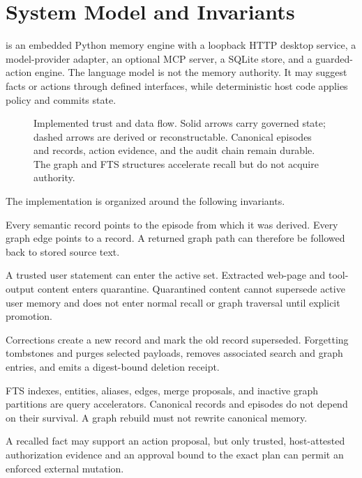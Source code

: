 \section{System Model and Invariants}
\label{sec:system-model}

\system{} is an embedded Python memory engine with a loopback HTTP desktop service, a model-provider adapter, an optional MCP server, a SQLite store, and a guarded-action engine. The language model is not the memory authority. It may suggest facts or actions through defined interfaces, while deterministic host code applies policy and commits state.

\begin{figure}[t]
  \centering
  
  \caption{Implemented trust and data flow. Solid arrows carry governed state; dashed arrows are derived or reconstructable. Canonical episodes and records, action evidence, and the audit chain remain durable. The graph and FTS structures accelerate recall but do not acquire authority.}
  \label{fig:architecture}
\end{figure}

The implementation is organized around the following invariants.

 Every semantic record points to the episode from which it was derived. Every graph edge points to a record. A returned graph path can therefore be followed back to stored source text.

 A trusted user statement can enter the active set. Extracted web-page and tool-output content enters quarantine. Quarantined content cannot supersede active user memory and does not enter normal recall or graph traversal until explicit promotion.

 Corrections create a new record and mark the old record superseded. Forgetting tombstones and purges selected payloads, removes associated search and graph entries, and emits a digest-bound deletion receipt.

 FTS indexes, entities, aliases, edges, merge proposals, and inactive graph partitions are query accelerators. Canonical records and episodes do not depend on their survival. A graph rebuild must not rewrite canonical memory.

 A recalled fact may support an action proposal, but only trusted, host-attested authorization evidence and an approval bound to the exact plan can permit an enforced external mutation.

